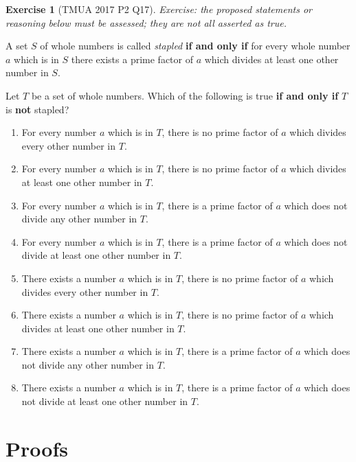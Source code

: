 \documentclass[11pt]{article}
\theoremstyle{definition}
\newtheorem{example}[theorem]{Exercise}
\theoremstyle{remark}
\begin{document}
\begin{example}[TMUA 2017 P2 Q17]\label{tmua-6-unit-018}
\textit{Exercise: the proposed statements or reasoning below must be assessed; they are not all asserted as true.}\par

    A set \(S\) of whole numbers is called \emph{stapled} \textbf{if and only if} for every whole number \(a\) which is in \(S\) there exists a prime factor of \(a\) which divides at least one other number in \(S\).

    Let \(T\) be a set of whole numbers. Which of the following is true \textbf{if and only if} \(T\) is \textbf{not} stapled?

    \begin{enumerate}[label=\Alph*.]
        \item For every number \(a\) which is in \(T\), there is no prime factor of \(a\) which divides every other number in \(T\).
        \item For every number \(a\) which is in \(T\), there is no prime factor of \(a\) which divides at least one other number in \(T\).
        \item For every number \(a\) which is in \(T\), there is a prime factor of \(a\) which does not divide any other number in \(T\).
        \item For every number \(a\) which is in \(T\), there is a prime factor of \(a\) which does not divide at least one other number in \(T\).
        \item There exists a number \(a\) which is in \(T\), there is no prime factor of \(a\) which divides every other number in \(T\).
        \item There exists a number \(a\) which is in \(T\), there is no prime factor of \(a\) which divides at least one other number in \(T\).
        \item There exists a number \(a\) which is in \(T\), there is a prime factor of \(a\) which does not divide any other number in \(T\).
        \item There exists a number \(a\) which is in \(T\), there is a prime factor of \(a\) which does not divide at least one other number in \(T\).
    \end{enumerate}
\end{example}

\section{Proofs}\label{tmua-6-section-002}
\end{document}
